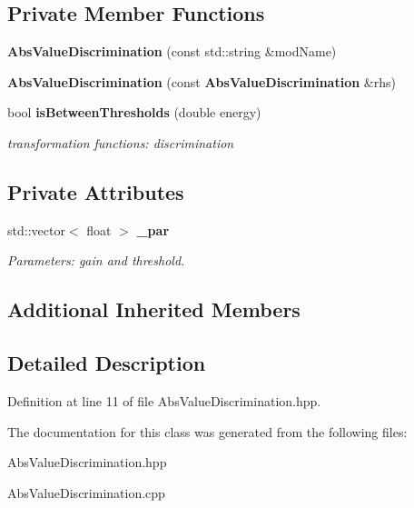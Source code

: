 \subsection*{Private Member Functions}
\begin{DoxyCompactItemize}
\item 
{\bfseries Abs\-Value\-Discrimination} (const std\-::string \&mod\-Name)\label{classdigisim_1_1AbsValueDiscrimination_af39b9771f74291127789faef98433b6b}

\item 
{\bfseries Abs\-Value\-Discrimination} (const {\bf Abs\-Value\-Discrimination} \&rhs)\label{classdigisim_1_1AbsValueDiscrimination_a0baeb9c354ae71e6b9c06c1f9ceec615}

\item 
bool {\bf is\-Between\-Thresholds} (double energy)\label{classdigisim_1_1AbsValueDiscrimination_adb4b98caa13a3f8f1f93552740684216}

\begin{DoxyCompactList}\small\item\em transformation functions\-: discrimination \end{DoxyCompactList}\end{DoxyCompactItemize}
\subsection*{Private Attributes}
\begin{DoxyCompactItemize}
\item 
std\-::vector$<$ float $>$ {\bf \-\_\-par}\label{classdigisim_1_1AbsValueDiscrimination_a81d100079e51de374bfbc82fcdcecefc}

\begin{DoxyCompactList}\small\item\em Parameters\-: gain and threshold. \end{DoxyCompactList}\end{DoxyCompactItemize}
\subsection*{Additional Inherited Members}


\subsection{Detailed Description}


Definition at line 11 of file Abs\-Value\-Discrimination.\-hpp.



The documentation for this class was generated from the following files\-:\begin{DoxyCompactItemize}
\item 
Abs\-Value\-Discrimination.\-hpp\item 
Abs\-Value\-Discrimination.\-cpp\end{DoxyCompactItemize}
